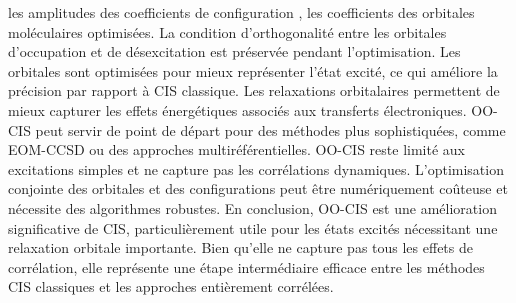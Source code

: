 {}\markdownRendererOlBeginTight
{}les amplitudes des coefficients de configuration ,\markdownRendererOlItemEnd 
{}les coefficients des orbitales moléculaires optimisées.\markdownRendererOlItemEnd 
\markdownRendererOlEndTight \markdownRendererInterblockSeparator
{}La condition d’orthogonalité entre les orbitales d’occupation et de désexcitation est préservée pendant l’optimisation.\markdownRendererInterblockSeparator
{}
\markdownRendererSectionEnd \markdownRendererSectionBegin
{}\markdownRendererInterblockSeparator
{}\markdownRendererOlBegin
{}\markdownRendererInterblockSeparator
{}\markdownRendererUlBeginTight
\markdownRendererUlItem Les orbitales sont optimisées pour mieux représenter l'état excité, ce qui améliore la précision par rapport à CIS classique.\markdownRendererUlItemEnd 
\markdownRendererUlEndTight \markdownRendererOlItemEnd 
{}\markdownRendererInterblockSeparator
{}\markdownRendererUlBeginTight
\markdownRendererUlItem Les relaxations orbitalaires permettent de mieux capturer les effets énergétiques associés aux transferts électroniques.\markdownRendererUlItemEnd 
\markdownRendererUlEndTight \markdownRendererOlItemEnd 
{}\markdownRendererInterblockSeparator
{}\markdownRendererUlBeginTight
\markdownRendererUlItem OO-CIS peut servir de point de départ pour des méthodes plus sophistiquées, comme EOM-CCSD ou des approches multiréférentielles.\markdownRendererUlItemEnd 
\markdownRendererUlEndTight \markdownRendererOlItemEnd 
\markdownRendererOlEnd \markdownRendererInterblockSeparator
{}
\markdownRendererSectionEnd \markdownRendererSectionBegin
{}\markdownRendererInterblockSeparator
{}\markdownRendererUlBeginTight
\markdownRendererUlItem OO-CIS reste limité aux excitations simples et ne capture pas les corrélations dynamiques.\markdownRendererUlItemEnd 
\markdownRendererUlItem L'optimisation conjointe des orbitales et des configurations peut être numériquement coûteuse et nécessite des algorithmes robustes.\markdownRendererUlItemEnd 
\markdownRendererUlEndTight \markdownRendererInterblockSeparator
{}En conclusion, OO-CIS est une amélioration significative de CIS, particulièrement utile pour les états excités nécessitant une relaxation orbitale importante. Bien qu'elle ne capture pas tous les effets de corrélation, elle représente une étape intermédiaire efficace entre les méthodes CIS classiques et les approches entièrement corrélées.\markdownRendererParagraphSeparator
